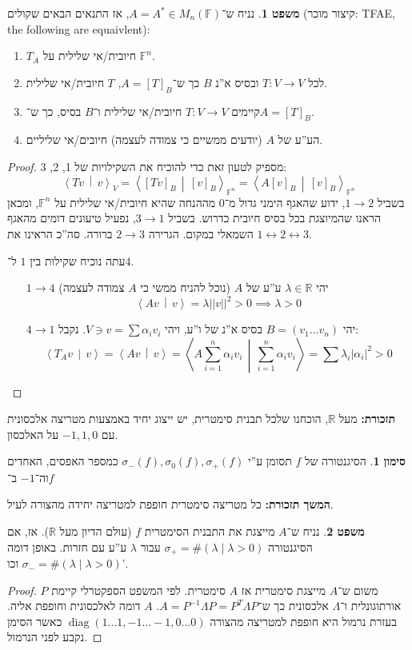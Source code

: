 \documentclass[a4paper]{article}
\newcommand\R     {\mathbb{R}}
\newcommand\ra    {\rangle}
\newcommand\la    {\langle}
\newcommand\sumnio    {\sum_{i = 1}^{n}}
\DeclareMathOperator{\diag}    {diag}
\newcommand\lra       {\leftrightarrow}
\newcommand\F         {\mathbb{F}}
\newcommand\co        {\colon}
\newcommand\norm[1]   {\left \vert \left \vert #1 \right \vert \right \vert}
\newcommand\mut [2]   {\left \la #1 \,\middle\vert\, #2 \right \ra}
\newcommand\ag        {\alpha}
\renewcommand\lg      {\lambda}
\newcommand\sg        {\sigma}
\newcommand\Lg        {\Lambda}
\newcommand\op    {^{-1}}
\theoremstyle{definition}
\newtheorem{Theorem}{משפט}
\newtheorem{Notion}{סימון}
\newcommand\theo  [1] {\begin{Theorem}#1\end{Theorem}}
\newcommand\noti  [1] {\begin{Notion}#1\end{Notion}}
\begin{document}
	\theo{נניח ש־$A = A^* \in M_n(\F)$, אז התנאים הבאים שקולים (קיצור מוכר: TFAE, the following are equaivlent): 
		\begin{enumerate}
			\item $T_A$ חיובית/אי שלילית על $\F^n$. 
			\item לכל $T \co V \to V$ ובסיס א''נ $B$ כך ש־$A = [T]_B$, $T$ חיובית/אי שלילית. 
			\item קיימים $T \co V \to V$ חיובית/אי שלילית ו־$B$ בסיס, כך ש־$A = [T]_B$. 
			\item הע''ע של $A$ (יודעים ממשיים כי צמודה לעצמה) חיובים/אי שליליים. 
	\end{enumerate}}
	\begin{proof}
		מספיק לטעון זאת כדי להוכיח את השקילויות של 1, 2, 3: 
		\[ \mut{Tv}{v}_V = \mut{[Tv]_B}{[v]_B}_{\F^n} = \mut{A[v]_B}{[v]_B}_{\F^n} \]
		בשביל $1 \to 2$, ידוע שהאגף הימני גדול מ־$0$ מההנחה שהיא חיובית/אי שלילית על $\F^n$, ומכאן הראנו שהמיוצגת בכל בסיס חיובית כדרוש. בשביל $3 \to 1$, נפעיל טיעונים דומים מהאגף השמאלי במקום. הגרירה $2 \to 3$ ברורה. סה''כ הראינו את $1\lra2\lra 3$. 
		
		עתה נוכיח שקילות בין $1$ ל־$4$. 
		\begin{itemize}
			\item[$1 \to 4$] יהי $\lg \in \R$ ע''ע של $A$ (נוכל להניח ממשי כי $A$ צמודה לעצמה)
			\[ \mut{Av}{v} = \lg\norm{v}^2 > 0 \implies \lg > 0 \]
			\item[$4 \to 1$] יהי $B = (v_1 \dots v_n)$ בסיס א''נ של ו''ע, ויהי $V \ni v = \sum \ag_i v_i$. נקבל: 
			\[ \mut{T_Av}{v} = \mut{Av}{v} = \mut{A\sumnio \ag_i v_i}{\sumnio \ag_i v_i} = \sum \lg_i |\ag_i|^2 > 0 \]
		\end{itemize}
	\end{proof}
	
	\textbf{תזכורת: }מעל $\R$, הוכחנו שלכל תבנית סימטרית, יש ייצוג יחיד באמצעות מטריצה אלכסונית עם $-1, 1, 0$ על האלכסון. 
	\noti{הסיגנטורה של $f$ תסומן ע''י $\sg_-(f), \sg_0(f), \sg_+(f)$ כמספר האפסים, האחדים וה־$-1$ ב־$f$}
	
	\textbf{המשך תזכורת: }כל מטריצה סימטרית חופפת למטריצה יחידה מהצורה לעיל. 
	
	\theo{נניח ש־$A$ מייצגת את התבנית הסימטרית $f$ (עולם הדיון מעל $\R$). אז, אם הסיגנטורה $\sg_+ = \#(\lg \mid \lg > 0)$ עבור $\lg$ ע''ע עם חזרות. באופן דומה $\sg_- = \#(\lg \mid \lg > 0)$ וכו'. }
	
	\begin{proof}
		משום ש־$A$ מייצגת סימטרית אז $A$ סימטרית. לפי המשפט הספקטרלי קיימת $P$ אורתוגונלית ו־$\Lg$ אלכסונית כך ש־$A = P\op\Lg P = P^T\Lg P$. $A$ דומה לאלכסונית וחופפת אליה. בעזרת נרמול היא חופפת למטריצה מהצורה $\diag(1 \dots 1, -1 \ldots -1, 0 \ldots 0)$ כאשר הסימן נקבע לפני הנרמול. 
	\end{proof}
	
\end{document}
